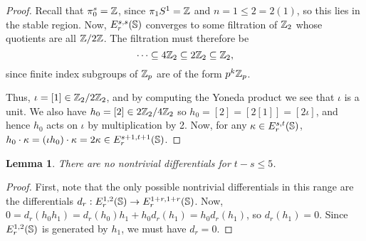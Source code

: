 \documentclass[11pt, titlepage]{article} %
\def\bb{\ensuremath\mathbb}
\def\subq{\ensuremath\subseteq}
\def\inte{\ensuremath\mathbb{Z}}
\numberwithin{equation}{subsection}
\theoremstyle{plain}
\newtheorem{lemma}[theorem]{Lemma}
\theoremstyle{definition}
\begin{document}
\begin{proof}
Recall that \(\pi_0^s=\inte\), since \(\pi_1S^1=\inte\) and \(n=1\leq 2=2(1)\), so this lies in the stable region. Now, \(E^{s,s}_r(\bb{S})\) converges to some filtration of \(\inte_2\) whose quotients are all \(\inte/2\inte\). The filtration must therefore be 
\[\cdots\subq 4\inte_2 \subq 2\inte_2 \subq \inte_2,\]
since finite index subgroups of \(\inte_p\) are of the form \(p^k\inte_p\). %

Thus, \(\iota=[1]\in \inte_2/2\inte_2\), and by computing the Yoneda product we see that \(\iota\) is a unit. We also have \(h_0=[2]\in 2\inte_2/4\inte_2\) so \(h_0=[2]=[2[1]]=[2\iota]\), and hence \(h_0\) acts on \(\iota\) by multiplication by 2. Now, for any \(\kappa\in E^{s,t}_r(\bb{S})\), \(h_0\cdot \kappa = (\iota h_0)\cdot \kappa=2\kappa\in E^{s+1,t+1}_r(\bb{S})\).
\end{proof}



\begin{lemma}\label{2504241225}
There are no nontrivial differentials for \(t-s\leq 5\). 
\end{lemma}

\begin{proof}
First, note that the only possible nontrivial differentials in this range are the differentials \(d_r : E_r^{1,2}(\bb{S}) \to E_r^{1+r, 1+r}(\bb{S})\). Now, \(0=d_r(h_0h_1)=d_r(h_0)h_1 + h_0d_r(h_1)=h_0d_r(h_1)\), so \(d_r(h_1)=0\). Since \(E_r^{1, 2}(\bb{S})\) is generated by \(h_1\), we must have \(d_r=0\). 
\end{proof}
\end{document}
